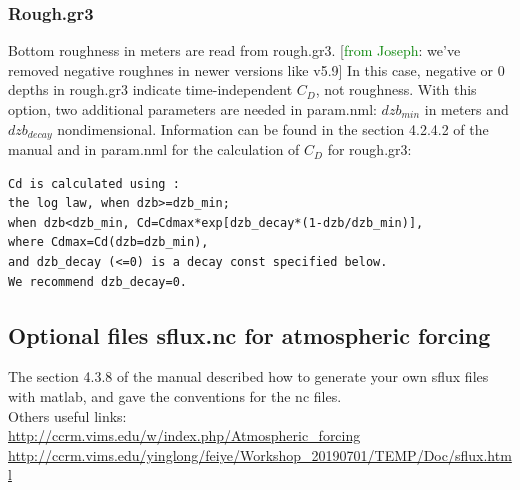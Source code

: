 \documentclass[preprints,briefreport,accept,oneauthor,pdftex]{Definitions/mdpi}
\begin{document}
\subsubsection{Rough.gr3}
Bottom roughness in meters are read from rough.gr3. [\textcolor{green}{from Joseph}: we've removed negative roughnes in newer versions like v5.9] In this case, negative or 0 depths in rough.gr3 indicate time-independent $C_D$, not roughness. With this option, two additional parameters are needed in param.nml: $dzb_{min}$ in meters and $dzb_{decay}$ nondimensional. Information can be found in the section 4.2.4.2 of the manual and in param.nml for the calculation of $C_D$ for rough.gr3:
\begin{lstlisting}
Cd is calculated using :
the log law, when dzb>=dzb_min; 
when dzb<dzb_min, Cd=Cdmax*exp[dzb_decay*(1-dzb/dzb_min)],
where Cdmax=Cd(dzb=dzb_min),
and dzb_decay (<=0) is a decay const specified below.
We recommend dzb_decay=0.
\end{lstlisting}
\subsection{Optional files sflux.nc for atmospheric forcing}
\noindent The section 4.3.8 of the manual described how to generate your own sflux files with matlab, and gave the conventions for the nc files. \\
Others useful links: \\
\url{http://ccrm.vims.edu/w/index.php/Atmospheric_forcing}\\
\url{http://ccrm.vims.edu/yinglong/feiye/Workshop_20190701/TEMP/Doc/sflux.html}\\
\end{document}
